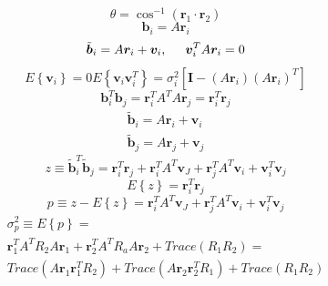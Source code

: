 \documentclass[12pt,a4paper,oneside]{article}
\begin{document}
\citet{gottlieb1978star}
\begin{equation}
\theta = \cos^{-1}(\bm{r}_1 \cdot \bm{r}_2)
\end{equation}
\begin{equation}
\bm{b}_i = A\bm{r}_i
\end{equation}
\begin{equation}
\tilde{\bm{b}}_i = A\bm{r}_i + \bm{v}_i, \hspace{0.5cm} \bm{v}_i^TA\bm{r}_i = 0
\end{equation}
\begin{subequations}
\begin{equation}
E\left\{\bm{v}_i\right\} = 0
\end{equation}
\begin{equation}
E\left\{\bm{v}_i\bm{v}_i^T\right\} = \sigma_i^2 [\bm{I} - (A\bm{r}_i)(A\bm{r}_i)^T]
\end{equation}
\end{subequations}
\begin{equation}
\bm{b}_i^T\bm{b}_j = \bm{r}_i^TA^TA\bm{r}_j = \bm{r}_i^T\bm{r}_j
\end{equation}
\begin{subequations}
\begin{align*}
\tilde{\bm{b}}_i = A\bm{r}_i + \bm{v}_i\\
\tilde{\bm{b}}_j = A\bm{r}_j + \bm{v}_j
\end{align*}
\end{subequations}
\begin{equation}
z \equiv \tilde{\bm{b}}_i^T\tilde{\bm{b}}_j = \bm{r}_i^T\bm{r}_j + \bm{r}_i^TA^T\bm{v}_J + \bm{r}_j^TA^T\bm{v}_i + \bm{v}_i^T\bm{v}_j
\end{equation}
\begin{equation}
E\left\{z\right\} = \bm{r}_i^T\bm{r}_j
\end{equation}
\begin{equation}
p \equiv z - E\left\{z\right\} = \bm{r}_i^TA^T\bm{v}_J + \bm{r}_j^TA^T\bm{v}_i + \bm{v}_i^T\bm{v}_j
\end{equation}
\begin{equation}
\begin{split}
\sigma_p^2 \equiv E\left\{p\right\} = \\
\bm{r}_1^TA^TR_2A\bm{r}_1 + \bm{r}_2^TA^TR_aA\bm{r}_2 + Trace(R_1R_2) = \\
Trace(A\bm{r}_1\bm{r}_1^TR_2) + Trace(A\bm{r}_2\bm{r}_2^TR_1) + Trace(R_1R_2)
\end{split}
\end{equation}
\end{document}

